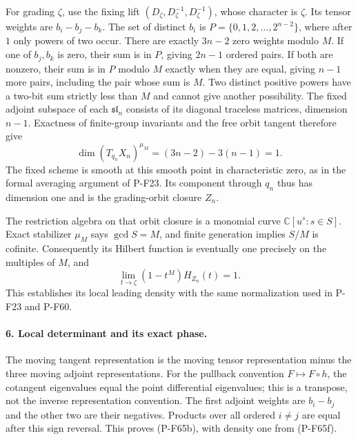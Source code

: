 For grading $\zeta$, use the fixing lift
$(D_\zeta,D_\zeta^{-1},D_\zeta^{-1})$, whose character is $\zeta$.
Its tensor weights are $b_i-b_j-b_k$.  The set of distinct
$b_i$ is $P=\{0,1,2,\ldots,2^{n-2}\}$, where after $1$ only
powers of two occur.  There are exactly $3n-2$ zero weights
modulo $M$.  If one of $b_j,b_k$ is zero, their sum is in $P$,
giving $2n-1$ ordered pairs.  If both are nonzero, their sum is
in $P$ modulo $M$ exactly when they are equal, giving $n-1$
more pairs, including the pair whose sum is $M$.
Two distinct positive powers have a two-bit sum strictly less
than $M$ and cannot give another possibility.
The fixed adjoint subspace of each $\mathfrak{sl}_n$ consists
of its diagonal traceless matrices, dimension $n-1$.
Exactness of finite-group invariants and the free orbit tangent
therefore give
\[
             \dim(T_{q_n}X_n)^{\mu_M}
                      =(3n-2)-3(n-1)=1.               \tag{P-F65e}
\]
The fixed scheme is smooth at this smooth point in characteristic
zero, as in the formal averaging argument of P-F23.
Its component through $q_n$ thus has dimension one and is the
grading-orbit closure $Z_n$.

The restriction algebra on that orbit closure is a monomial
curve $\mathbb C[u^s:s\in S]$.  Exact stabilizer $\mu_M$ says
$\gcd S=M$, and finite generation implies $S/M$ is cofinite.
Consequently its Hilbert function is eventually one precisely
on the multiples of $M$, and
\[
                 \lim_{t\to\zeta}(1-t^M)H_{Z_n}(t)=1. \tag{P-F65f}
\]
This establishes its local leading density with the same
normalization used in P-F23 and P-F60.

\paragraph{6. Local determinant and its exact phase.}
The moving tangent representation is the moving tensor
representation minus the three moving adjoint representations.
For the pullback convention $F\mapsto F\circ h$, the cotangent
eigenvalues equal the point differential eigenvalues; this is
a transpose, not the inverse representation convention.
The first adjoint weights are $b_i-b_j$ and the other two are
their negatives.  Products over all ordered $i\ne j$ are equal
after this sign reversal.  This proves (P-F65b), with density
one from (P-F65f).

